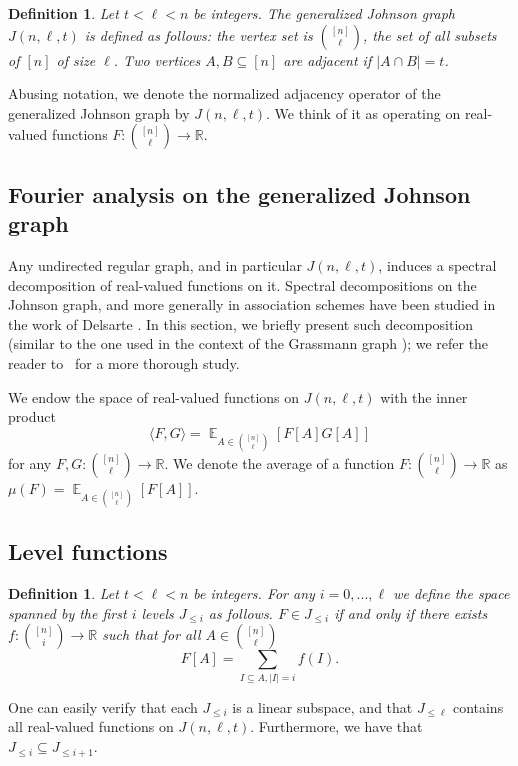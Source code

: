 \documentclass[11pt]{article}
\newtheorem{definition}[theorem]{Definition}
\newcommand\card[1]{\left| {#1} \right|}
\newcommand\Expect[2]{{\mathop{\mathbb{E}}_{#1}\left[ {#2} \right]}}
\newcommand\inner[2]{\langle{#1},{#2}\rangle}
\renewcommand\leq{\leqslant}
\begin{document}
%
%
%

%
%

\begin{definition}
Let $t<\ell<n$ be integers. The
\emph{generalized Johnson graph}  %
 $J(n,\ell,t)$ is defined as follows:
the vertex set is ${[n] \choose \ell}$, the set of all subsets of $[n]$ of size $\ell$.
Two vertices $A,B\subseteq [n]$ are %
adjacent  %
if %
%
$\card{A\cap B} = t$.
\end{definition}

Abusing notation, we denote the normalized adjacency operator of the generalized
Johnson graph by $J(n,\ell,t)$.  We think of it as operating on
%
real-valued  %
functions
$F\colon {[n] \choose \ell}\to\mathbb{R}$.

\subsection{Fourier analysis on the generalized Johnson graph}
Any undirected regular graph, %
and in particular $J(n,\ell,t)$, %
induces a spectral decomposition of
real-valued functions on it.
Spectral decompositions on the Johnson graph, and more generally in association schemes have been studied in the %
work  %
of Delsarte \cite{Delsarte,Delsarte2}. In this section, we briefly present such decomposition (similar to the one
used in the context of the Grassmann graph \cite{DKKMSgras}); we refer the reader to~\cite{Godsil} for a more thorough study.

%
%
%
We endow the space of real-valued functions on $J(n,\ell,t)$ with the inner product
\[
\inner{F}{G} = \Expect{A\in {[n] \choose \ell}}{F[A]G[A]}
\]
for any $F,G\colon {[n] \choose \ell}\to\mathbb{R}$.
We denote the average of a function $F\colon {[n] \choose \ell}\to\mathbb{R}$ as $\mu(F) = \Expect{A\in{[n]\choose \ell}}{F[A]}$.

\subsection{Level functions}
\begin{definition}
Let $t<\ell<n$ be integers. For any $i=0,...,\ell$ we define the space spanned by the
first $i$ levels $J_{\leq i}$ as follows. $F\in J_{\leq i}$ if and only if there exists
$f\colon {[n] \choose i}\to \mathbb{R}$ such that for all $A\in\binom{[n]}{\ell}$
\[
F[A] = \sum\limits_{I\subseteq A, \card{I} = i}{f(I)}.
\]
%
%
%
\end{definition}
One can easily verify that each $J_{\leq i}$ is a linear subspace, and that
$J_{\leq \ell}$ contains all real-valued functions on $J(n,\ell,t)$. Furthermore, we have that
$J_{\leq i}\subseteq J_{\leq i+1}$.
\end{document}

